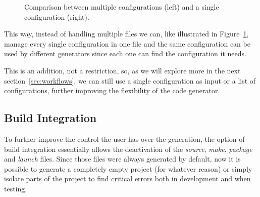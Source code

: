 \begin{figure}[h]
	\centering
{}
\hspace{1cm}
\caption{Comparison between multiple configurations (left) and a single configuration (right).}
\label{fig:tree_config_comparison}
\end{figure}


This way, instead of handling multiple files we can, like illustrated in Figure~\ref{fig:tree_config_comparison}, manage every single configuration in one file and the same configuration can be used by different generators since each one can find the configuration it needs.

This is an addition, not a restriction, so, as we will explore more in the next section~\ref{sec:workflows}, we can still use a single configuration as input or a list of configurations, further improving the flexibility of the code generator.


\subsection{Build Integration}
\label{sec:impl_build_options}

To further improve the control the user has over the generation, the option of build integration essentially allows the deactivation of the \textit{source}, \textit{make}, \textit{package} and \textit{launch} files. Since those files were always generated by default, now it is possible to generate a completely empty project (for whatever reason) or simply isolate parts of the project to find critical errors both in development and when testing.

